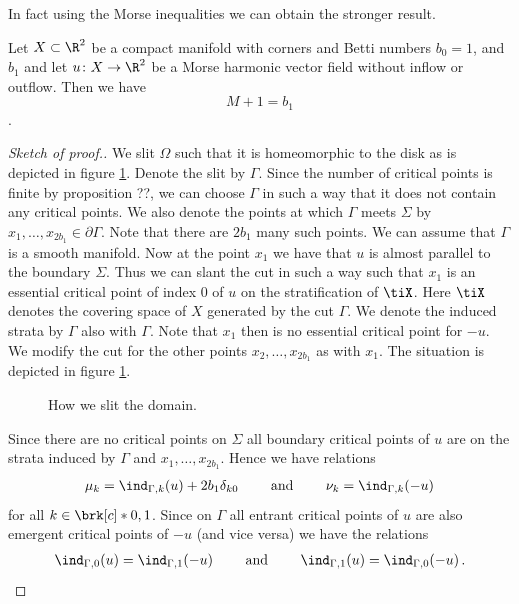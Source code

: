 In fact using the Morse inequalities we can obtain the stronger result.
\begin{proposition}
  Let $X\subset\R^2$ be a compact manifold with corners and Betti numbers $b_0=1$, and $b_1$
  and let $u\colon X\to\R^2$ be 
  a Morse harmonic vector field without inflow or outflow.
  Then we have $$M+1=b_1$$.
\end{proposition}
\begin{proof}[Sketch of proof.]
  We slit $\Omega$ such that it is homeomorphic to the disk as is 
  depicted in figure \ref{fi:n2_hvf_slitDomain}.
  Denote the slit by $\Gamma$. Since the number of critical points is 
  finite by proposition ??, we can choose $\Gamma$ in such a way that it does not contain
  any critical points.
   We also denote the points at which
  $\Gamma$ meets $\Sigma$ by $x_1,\dots,x_{2b_1}\in\partial\Gamma$.
  Note that there are $2b_1$ many such points.
  We can assume that $\Gamma$ is a smooth manifold. Now at the point $x_1$
  we have that $u$ is almost parallel to the boundary $\Sigma$. Thus we can slant
  the cut in such a way such that $x_1$ is an essential critical point of index $0$ of $u$ on the stratification
  of $\tiX$. Here $\tiX$ denotes the covering space of $X$ generated by the cut $\Gamma$.
  We denote the induced strata by $\Gamma$ also with $\Gamma$. Note that $x_1$ then is no
  essential critical point for $-u$.
  We modify the cut for the other points $x_2,\dots,x_{2b_1}$ as with $x_1$.
  The situation is depicted in figure \ref{fi:n2_hvf_slitDomain}.
  \begin{figure}
    \centering
    
    \caption{How we slit the domain.}
    \label{fi:n2_hvf_slitDomain}
  \end{figure}
  Since there are no critical points on $\Sigma$ all boundary critical points of $u$ are on
  the strata induced by $\Gamma$ and $x_1,\dots,x_{2b_1}$. Hence we have relations
  \begin{align}
    \mu_k=\ind_{\Gamma,k}(u)+2b_1\delta_{k0} \qquad\text{ and }\qquad
    \nu_k=\ind_{\Gamma,k}(-u)\label{eq:n2_hvf_noInflowNoOutflow_relationsMuIndex}
  \end{align}
  for all $k\in\brk[c]*{0,1}$.
  Since on $\Gamma$ all entrant critical points of $u$ are also emergent
  critical points of $-u$ (and vice versa) we have the relations
  \begin{align}
    \ind_{\Gamma,0}(u)=\ind_{\Gamma,1}(-u) \qquad\text{ and }\qquad
    \ind_{\Gamma,1}(u)=\ind_{\Gamma,0}(-u)\,.\label{eq:n2_hvf_noInflowNoOutflow_relationsIndex}

\end{align}
\end{proof}
